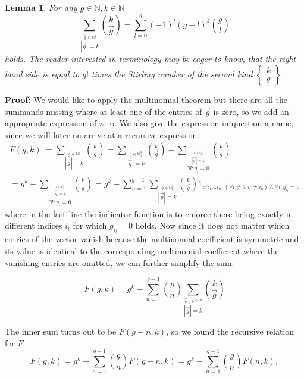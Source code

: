 \documentclass[b5paper,draft,openbib,12pt]{memoir}
\newtheorem{Lemma}[Def]{Lemma}
\begin{document}
\begin{Lemma}\label{stirling lemma}
For any \(g\in\mathbb{N},k\in\mathbb{N}\)
\begin{equation}
\sum_{\stackrel{\vec{g}\in\mathbb{N}^g}{|\vec{g}|=k}} \binom{k}{\vec{g}}=\sum_{l=0}^g (-1)^l (g-l)^k \binom{g}{l}
\end{equation}
holds. The reader interested in terminology may be eager to know, that the right hand side is equal to
 \(g!\) times the Stirling 
number of the second kind \(\left\{\begin{matrix}k\\g\end{matrix}\right\}\).
\end{Lemma}
\textbf{Proof:} We would like to apply the multinomial theorem but there are all the summands missing where at least
one of the entries of \(\vec{g}\) is zero, so we add an appropriate expression of zero. We also give the expression in
question a name, since we will later on arrive at a recursive expression.
\begin{multline}
F(g,k):=\sum_{\stackrel{\vec{g}\in\mathbb{N}^g}{|\vec{g}|=k}} \binom{k}{\vec{g}}
= \sum_{\stackrel{\vec{g}\in\mathbb{N}_0^g}{|\vec{g}|=k}} \binom{k}{\vec{g}}
- \sum_{\stackrel{\stackrel{\vec{g}\in\mathbb{N}_0^g}{|\vec{g}|=k}}{\exists l: g_l=0}} \binom{k}{\vec{g}}\\
= g^k 
 - \sum_{\stackrel{\stackrel{\vec{g}\in\mathbb{N}_0^g}{|\vec{g}|=k}}{\exists l: g_l=0}} \binom{k}{\vec{g}}
=g^k 
- \sum_{n=1}^{g-1} \sum_{\stackrel{\vec{g}\in\mathbb{N}_0^g}{|\vec{g}|=k}}
 \binom{k}{\vec{g}} 1_{\exists! i_1\dots i_n : (\forall l\neq b:  i_l\neq i_b) \wedge \forall l :g_{i_l}=0}
\end{multline}
where in the last line the indicator function is to enforce there being exactly n different indices \(i_l\) for which \(g_{i_l}=0\)
holds. Now since it does not matter which entries of the vector vanish because the multinomial coefficient 
is symmetric and its value is identical to the corresponding multinomial coefficient where the vanishing entries
are omitted, we can further simplify the sum:

\begin{equation*}
F(g,k)= g^k -  \sum_{n=1}^{g-1} \binom{g}{n} \sum_{\stackrel{\vec{g}\in\mathbb{N}^{g-n}}{|\vec{g}|=k}}
 \binom{k}{\vec{g}}
\end{equation*}

The inner sum turns out to be \(F(g-n,k)\), so we found the recursive relation for \(F\):
\begin{equation}\label{combinatorics solution recursive}
F(g,k)= g^k -  \sum_{n=1}^{g-1} \binom{g}{n} F(g-n,k)= g^k -  \sum_{n=1}^{g-1} \binom{g}{n} F(n,k),
\end{equation}
\end{document}
